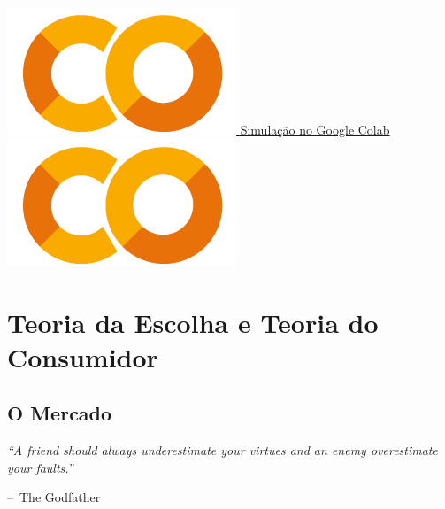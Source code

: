 \documentclass[a4paper,11pt,oneside]{book}
\makeatletter
\theoremstyle{definition}
\theoremstyle{break}
\newenvironment{chapquote}[2][2em]
  {\setlength{\@tempdima}{#1}%
   \def\chapquote@author{#2}%
   \parshape 1 \@tempdima \dimexpr\textwidth-2\@tempdima\relax%
   \itshape}
  {\par\normalfont\hfill--\ \chapquote@author\hspace*{\@tempdima}\par\bigskip}
\makeatother
\begin{document}
\begin{center}
\\
\ 
\\
\href{https://drive.google.com/file/d/1WhxGaAhUB9dKkgrKWadihIrzS4cm3bXP/view?usp=sharing}{\includegraphics[scale=0.08]{_colab_logo.png} Simulação no Google Colab \includegraphics[scale=0.08]{_colab_logo.png}}
\end{center}

\part{Teoria da Escolha e Teoria do Consumidor}

\chapter{O Mercado}

\begin{chapquote}{The Godfather}
	``A friend should always underestimate your virtues and an enemy overestimate your faults.''
\end{chapquote}
\end{document}
